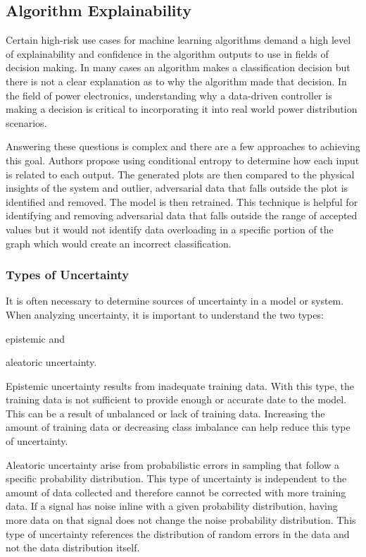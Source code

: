 \subsection{Algorithm Explainability}

Certain high-risk use cases for machine learning algorithms demand a high level of explainability and confidence in the algorithm outputs to use in fields of decision making. In many cases an algorithm makes a classification decision but there is not a clear explanation as to why the algorithm made that decision. In the field of power electronics, understanding why a data-driven controller is making a decision is critical to incorporating it into real world power distribution scenarios.

Answering these questions is complex and there are a few approaches to achieving this goal. Authors \cite{black-box-explainability} propose using conditional entropy to determine how each input is related to each output. The generated plots are then compared to the physical insights of the system and outlier, adversarial data that falls outside the plot is identified and removed. The model is then retrained. This technique is helpful for identifying and removing adversarial data that falls outside the range of accepted values but it would not identify data overloading in a specific portion of the graph which would create an incorrect classification.

\subsubsection{Types of Uncertainty}
It is often necessary to determine sources of uncertainty in a model or system. When analyzing uncertainty, it is important to understand the two types:
\begin{inlinelist}
    \item epistemic and
    \item aleatoric uncertainty.
\end{inlinelist}

Epistemic uncertainty results from inadequate training data. With this type, the training data is not sufficient to provide enough or accurate date to the model. This can be a result of unbalanced or lack of training data. Increasing the amount of training data or decreasing class imbalance can help reduce this type of uncertainty.

Aleatoric uncertainty arise from probabilistic errors in sampling that follow a specific probability distribution. This type of uncertainty is independent to the amount of data collected and therefore cannot be corrected with more training data. If a signal has noise inline with a given probability distribution, having more data on that signal does not change the noise probability distribution. This type of uncertainty references the distribution of random errors in the data and not the data distribution itself.

